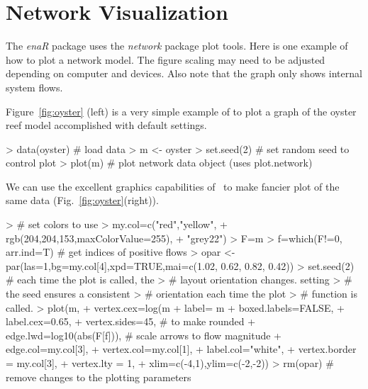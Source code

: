 \documentclass[article]{jss}
\begin{document}
\section{Network Visualization}

The \textit{enaR} package uses the \textit{network} package plot tools. Here is
one example of how to plot a network model. The figure scaling may
need to be adjusted depending on computer and devices. Also note that
the graph only shows internal system flows.

Figure~\ref{fig:oyster} (left) is a very simple example of to plot a
graph of the oyster reef model accomplished with default settings.


\begin{Schunk}
\begin{Sinput}
> data(oyster)  # load data
> m <- oyster
> set.seed(2)    # set random seed to control plot
> plot(m)       # plot network data object (uses plot.network)
\end{Sinput}
\end{Schunk}

We can use the excellent graphics capabilities of \R\ to make fancier
plot of the same data (Fig.~\ref{fig:oyster}(right)).


\begin{Schunk}
\begin{Sinput}
> # set colors to use
> my.col=c("red","yellow",
+   rgb(204,204,153,maxColorValue=255),
+   "grey22")
> F=m%
> f=which(F!=0, arr.ind=T)       # get indices of positive flows
> opar <- par(las=1,bg=my.col[4],xpd=TRUE,mai=c(1.02, 0.62, 0.82, 0.42))
> set.seed(2)                    # each time the plot is called, the
>                                # layout orientation changes.  setting
>                                # the seed ensures a consistent
>                                # orientation each time the plot
>                                # function is called.
> plot(m,
+      vertex.cex=log(m%
+      label= m%
+      boxed.labels=FALSE,
+      label.cex=0.65,
+      vertex.sides=45,   # to make rounded
+      edge.lwd=log10(abs(F[f])),     # scale arrows to flow magnitude
+      edge.col=my.col[3],
+      vertex.col=my.col[1],
+      label.col="white",
+      vertex.border = my.col[3],
+      vertex.lty = 1,
+      xlim=c(-4,1),ylim=c(-2,-2))
> rm(opar)             # remove changes to the plotting parameters
\end{Sinput}
\end{Schunk}
\end{document}
